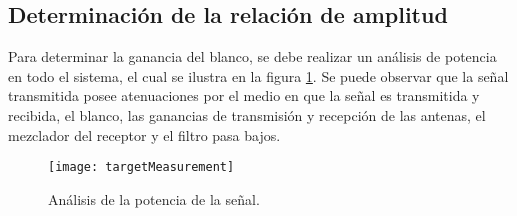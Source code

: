 


\subsection{Determinación de la relación de amplitud}


Para determinar la ganancia del blanco, se debe realizar un análisis de potencia en todo el sistema, el cual se ilustra en la figura  \ref{fig:powerAnalysis}. Se puede observar que la señal transmitida posee atenuaciones por el medio en que la señal es transmitida y recibida, el blanco, las ganancias de transmisión y recepción de las antenas, el mezclador del receptor y el filtro pasa bajos. 

\begin{figure}
 \centering
 \texttt{[image: targetMeasurement]}
 \caption{Análisis de la potencia de la señal.}
 \label{fig:powerAnalysis}
\end{figure}

